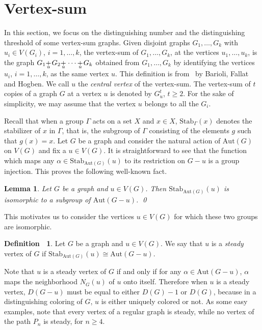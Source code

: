 \documentclass[12pt,a4paper, longbibliography]{article}
\newcommand\stackplus[1]{\makebox[0ex][l]{$+$} \raisebox{-.75ex}{\makebox[2ex]{$_{#1}$}}}
\newcommand{\aut}{\mathrm{Aut}}
\newcommand{\stab}{\mathrm{Stab}}
\newtheorem{lemma}[theorem]{{\color{THM}Lemma}}
\theoremstyle{definition}
\newtheorem{definition}[theorem]{{\color{THM}Definition\ }}
\numberwithin{equation}{section}
\begin{document}
	
	
		

	\section{Vertex-sum}\label{vertex_sum}
	
	In this section, we focus on the distinguishing number and the distinguishing threshold of some vertex-sum graphs. Given  disjoint graphs $G_1,\ldots,G_k$ with $u_i\in V(G_i)$, $i=1,\ldots,k$, the vertex-sum of $G_1,\ldots,G_k$,  at the vertices $u_1,\ldots,u_k$, is the graph $G_1\stackplus{u} G_2 \stackplus{u} \cdots \stackplus{u}  G_k$ obtained from $G_1,\ldots,G_k$ by identifying the vertices $u_i$, $i=1,\ldots,k$, as the same vertex $u$. This definition is from~\cite{Barioli2004} by Barioli, Fallat and Hogben. We call $u$ the \textit{central vertex} of the vertex-sum.	The vertex-sum of $t$ copies of a graph $G$ at a vertex $u$ is denoted by $G_u^t$, $t \geq 2$.	For the sake of simplicity,	we may assume that the vertex $u$ belongs to all the  $G_i$.
	
	Recall that when a group $\Gamma$ acts on a set $X$ and $x\in X$, $\stab_\Gamma(x)$ denotes the stabilizer of $x$ in $\Gamma$, that is, the subgroup of $\Gamma$ consisting of the elements $g$ such that $g(x)=x$.
	Let $G$ be a graph and consider the natural action of $\aut(G)$ on $V(G)$ and  fix a  $u \in V(G)$. It is straightforward to see that the function which maps any $\alpha \in \stab_{\aut(G)}(u)$ to its restriction on $G-u$ is a group injection. This proves the following well-known fact.
	
	
	
	
	\begin{lemma}\label{stab_subgroup}
		Let $G$ be a graph and $u \in V(G)$. Then $\stab_{\aut(G)}(u)$ is isomorphic to a subgroup of $\aut(G-u)$. \qed
	\end{lemma}
	This  motivates us  to consider the vertices $u\in V(G)$ for which these two groups are isomorphic. 
	
	\begin{definition} Let $G$ be a graph and $u\in V(G)$. We say that $u$ is a  \textit{steady} vertex of $G$ if $\stab_{\aut(G)}(u)\cong \aut(G-u)$.
	\end{definition}
	Note that $u$ is a steady vertex of $G$ if and only if for any $\alpha \in \aut(G-u)$, $\alpha$ maps the neighborhood $N_G(u)$ of $u$ onto itself. 
	Therefore when $u$ is a steady vertex, $D(G-u)$ must be equal to either  $D(G)-1$ or $D(G)$, because in a distinguishing coloring of $G$, $u$ is either uniquely colored or not. As some easy examples, note that every vertex of a regular graph is steady, while no vertex of the path $P_n$ is steady, for $n\geq 4$.
		
\end{document}
